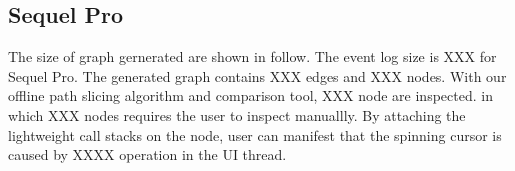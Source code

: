 \subsection{Sequel Pro}
The size of graph gernerated are shown in follow.
The event log size is XXX for Sequel Pro.
The generated graph contains XXX edges and XXX nodes.
With our offline path slicing algorithm and comparison tool,
XXX node are inspected.
in which XXX nodes requires the user to inspect manuallly.
By attaching the lightweight call stacks on the node,
user can manifest that the spinning cursor
is caused by XXXX operation in the UI thread.
